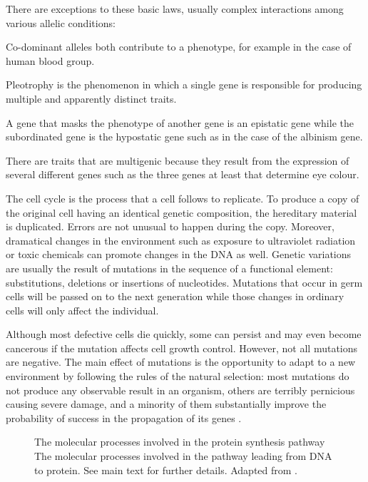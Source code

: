 There are exceptions to these basic laws, usually complex interactions among various allelic 
conditions: 
\begin{mitemize}	
\item
Co-dominant alleles both contribute to a phenotype, for example in the case of human blood group. 
\item
Pleotrophy is the phenomenon in which a single gene is responsible for producing multiple and 
apparently distinct traits.
\item
A gene that masks the phenotype of another gene is an epistatic gene while the subordinated gene
is the hypostatic gene such as in the case of the albinism gene.
\item
There are traits that are multigenic because they result from the expression of several different
genes such as the three genes at least that determine eye colour.
\end{mitemize}

The cell cycle is the process that a cell follows to replicate. 
% 
To produce a copy of the original
cell having an identical genetic composition, the hereditary material is duplicated. Errors are
not unusual to happen during the copy. Moreover, dramatical changes in the environment
such as exposure to ultraviolet radiation or toxic chemicals can promote changes in the DNA 
as well. Genetic variations are usually the result of mutations in the sequence of a functional 
element: substitutions, deletions or insertions of nucleotides. 
%  
Mutations that occur in germ cells 
will be passed on to the next generation while those changes in ordinary cells will only affect 
the individual.

Although most defective cells die quickly, some can persist and may even become cancerous if the 
mutation affects cell growth control. However, not all mutations are negative. The main
effect of mutations is the opportunity to adapt to a new environment by following the rules of the
natural selection: most mutations do not produce any observable result in an organism, others are 
terribly pernicious causing severe damage, and a minority of them substantially improve the probability 
of success in the propagation of its genes \citep{alberts:1994a}.

\begin{figure}[t!]
\begin{center}
\setlength{\fboxsep}{0pt}
          {The molecular processes involved in the protein synthesis pathway}%
          {The molecular processes involved in the pathway leading from DNA to protein.}%
          {See main text for further details. Adapted from \citet{blanco:2005a}.}
\end{center}
\end{figure}

